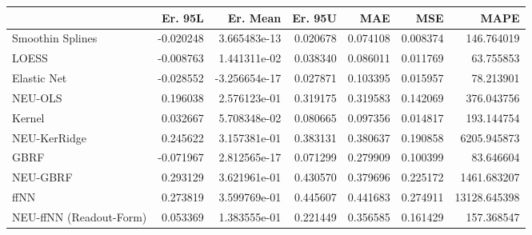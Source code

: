 \begin{tabular}{lrrrrrr}
\toprule
{} &   Er. 95L &      Er. Mean &   Er. 95U &       MAE &       MSE &          MAPE \\
\midrule
Smoothin Splines        & -0.020248 &  3.665483e-13 &  0.020678 &  0.074108 &  0.008374 &    146.764019 \\
LOESS                   & -0.008763 &  1.441311e-02 &  0.038340 &  0.086011 &  0.011769 &     63.755853 \\
Elastic Net             & -0.028552 & -3.256654e-17 &  0.027871 &  0.103395 &  0.015957 &     78.213901 \\
NEU-OLS                 &  0.196038 &  2.576123e-01 &  0.319175 &  0.319583 &  0.142069 &    376.043756 \\
Kernel                  &  0.032667 &  5.708348e-02 &  0.080665 &  0.097356 &  0.014817 &    193.144754 \\
NEU-KerRidge            &  0.245622 &  3.157381e-01 &  0.383131 &  0.380637 &  0.190858 &   6205.945873 \\
GBRF                    & -0.071967 &  2.812565e-17 &  0.071299 &  0.279909 &  0.100399 &     83.646604 \\
NEU-GBRF                &  0.293129 &  3.621961e-01 &  0.430570 &  0.379696 &  0.225172 &   1461.683207 \\
ffNN                    &  0.273819 &  3.599769e-01 &  0.445607 &  0.441683 &  0.274911 &  13128.645398 \\
NEU-ffNN (Readout-Form) &  0.053369 &  1.383555e-01 &  0.221449 &  0.356585 &  0.161429 &    157.368547 \\
\bottomrule
\end{tabular}
